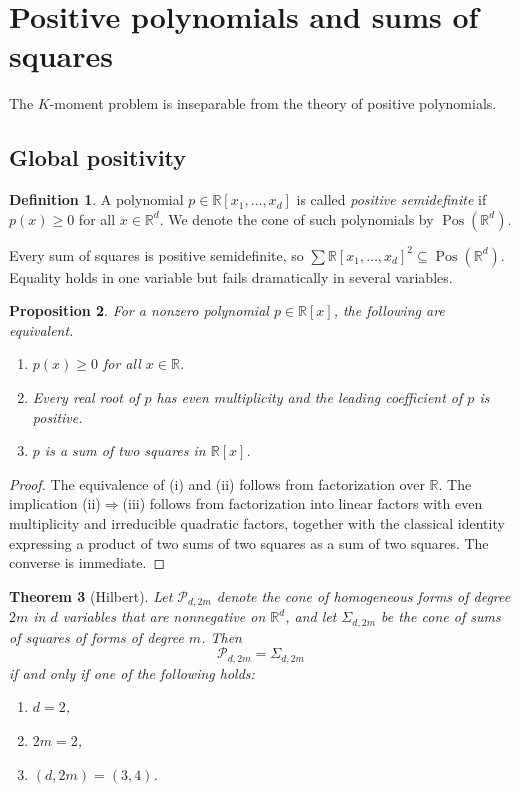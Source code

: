 \documentclass[11pt]{amsart}
\numberwithin{equation}{section}
\newtheorem{theorem}{Theorem}[section]
\newtheorem{proposition}[theorem]{Proposition}
\theoremstyle{definition}
\newtheorem{definition}[theorem]{Definition}
\theoremstyle{remark}
\newcommand{\R}{\mathbb{R}}
\newcommand{\Rxd}{\R[x_1,\dots,x_d]}
\newcommand{\Pos}{\operatorname{Pos}}
\newcommand{\sos}{\sum \R[x_1,\dots,x_d]^2}
\newcommand{\1}{\mathbf{1}}
\begin{document}
\section{Positive polynomials and sums of squares}\label{sec:sos}

The \(K\)-moment problem is inseparable from the theory of positive polynomials.

\subsection{Global positivity}

\begin{definition}
A polynomial \(p\in\Rxd\) is called \emph{positive semidefinite} if \(p(x)\ge 0\) for all \(x\in\R^d\). We denote the cone of such polynomials by \(\Pos(\R^d)\).
\end{definition}

Every sum of squares is positive semidefinite, so \(\sos\subseteq \Pos(\R^d)\). Equality holds in one variable but fails dramatically in several variables.

\begin{proposition}\label{prop:univariate}
For a nonzero polynomial \(p\in\R[x]\), the following are equivalent.
\begin{enumerate}[label=\textup{(\roman*)}, leftmargin=2em]
\item \(p(x)\ge 0\) for all \(x\in\R\).
\item Every real root of \(p\) has even multiplicity and the leading coefficient of \(p\) is positive.
\item \(p\) is a sum of two squares in \(\R[x]\).
\end{enumerate}
\end{proposition}

\begin{proof}
The equivalence of \textup{(i)} and \textup{(ii)} follows from factorization over \(\R\). The implication \textup{(ii)}\(\Rightarrow\)\textup{(iii)} follows from factorization into linear factors with even multiplicity and irreducible quadratic factors, together with the classical identity expressing a product of two sums of two squares as a sum of two squares. The converse is immediate.
\end{proof}

\begin{theorem}[Hilbert]\label{thm:hilbert}
Let \(\mathcal{P}_{d,2m}\) denote the cone of homogeneous forms of degree \(2m\) in \(d\) variables that are nonnegative on \(\R^d\), and let \(\Sigma_{d,2m}\) be the cone of sums of squares of forms of degree \(m\). Then
\[
\mathcal{P}_{d,2m}=\Sigma_{d,2m}
\]
if and only if one of the following holds:
\begin{enumerate}[label=\textup{(\roman*)}, leftmargin=2em]
\item \(d=2\),
\item \(2m=2\),
\item \((d,2m)=(3,4)\).
\end{enumerate}
\end{theorem}
\end{document}
